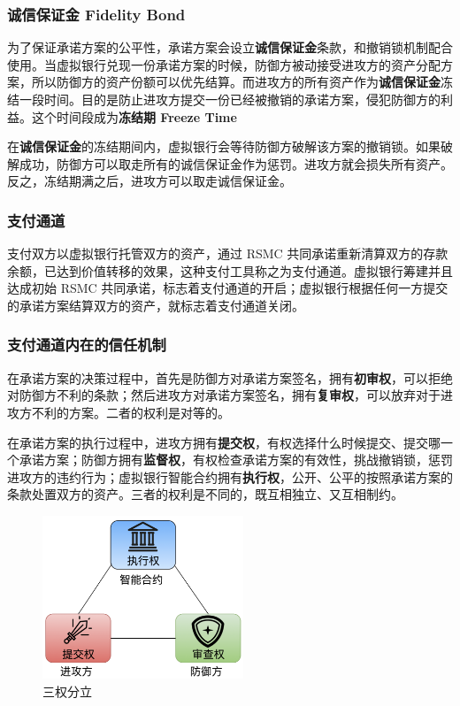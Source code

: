 \subsubsection{诚信保证金 Fidelity Bond}
为了保证承诺方案的公平性，承诺方案会设立\textbf{诚信保证金}条款，和撤销锁机制配合使用。当虚拟银行兑现一份承诺方案的时候，防御方被动接受进攻方的资产分配方案，所以防御方的资产份额可以优先结算。而进攻方的所有资产作为\textbf{诚信保证金}冻结一段时间。目的是防止进攻方提交一份已经被撤销的承诺方案，侵犯防御方的利益。这个时间段成为\textbf{冻结期 Freeze Time}

在\textbf{诚信保证金}的冻结期间内，虚拟银行会等待防御方破解该方案的撤销锁。如果破解成功，防御方可以取走所有的诚信保证金作为惩罚。进攻方就会损失所有资产。反之，冻结期满之后，进攻方可以取走诚信保证金。

\subsubsection{支付通道}
支付双方以虚拟银行托管双方的资产，通过 RSMC 共同承诺重新清算双方的存款余额，已达到价值转移的效果，这种支付工具称之为支付通道。虚拟银行筹建并且达成初始 RSMC 共同承诺，标志着支付通道的开启；虚拟银行根据任何一方提交的承诺方案结算双方的资产，就标志着支付通道关闭。

\subsubsection{支付通道内在的信任机制}
在承诺方案的决策过程中，首先是防御方对承诺方案签名，拥有\textbf{初审权}，可以拒绝对防御方不利的条款；然后进攻方对承诺方案签名，拥有\textbf{复审权}，可以放弃对于进攻方不利的方案。二者的权利是对等的。

在承诺方案的执行过程中，进攻方拥有\textbf{提交权}，有权选择什么时候提交、提交哪一个承诺方案；防御方拥有\textbf{监督权}，有权检查承诺方案的有效性，挑战撤销锁，惩罚进攻方的违约行为；虚拟银行智能合约拥有\textbf{执行权}，公开、公平的按照承诺方案的条款处置双方的资产。三者的权利是不同的，既互相独立、又互相制约。

\begin{figure}[h!]
    \centering
    \includegraphics[width=6cm, keepaspectratio]{../images/trias.png}
    \caption{三权分立}
    \label{fig:trias}
\end{figure}

